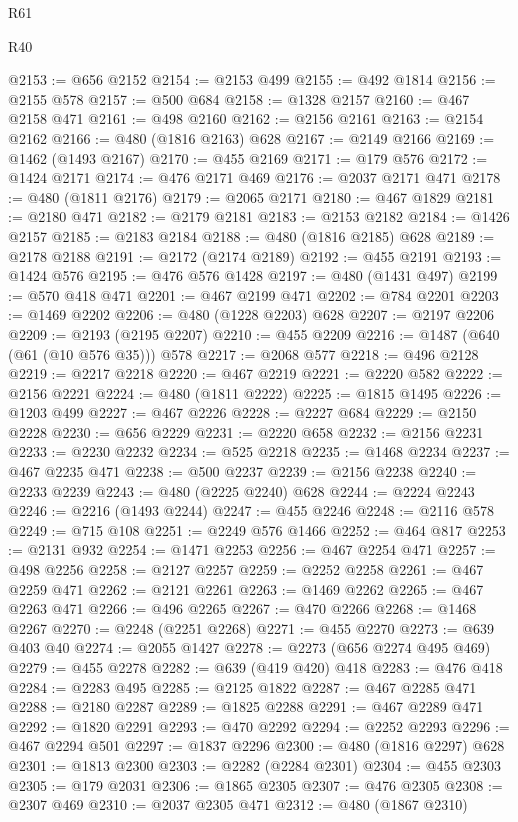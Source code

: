 \begin{lexlean}{R61}
\begin{lexlean}{R40}
\begin{coremodule}
{{{{{{{{{{{{{{{{{{{{{{{{{{{{{{{{{{{{{{{{{{{{{{{{{{{{{{{{{{{{{{{{{{{{{{{{{{{{{{{{{{{{{{{{{{{{{{{{{{{{{{{{{{{{{@2153 := @656 @2152
@2154 := @2153 @499
@2155 := @492 @1814
@2156 := @2155 @578
@2157 := @500 @684
@2158 := @1328 @2157
@2160 := @467 @2158 @471
@2161 := @498 @2160
@2162 := @2156 @2161
@2163 := @2154 @2162
@2166 := @480 (@1816 @2163) @628
@2167 := @2149 @2166
@2169 := @1462 (@1493 @2167)
@2170 := @455 @2169
@2171 := @179 @576
@2172 := @1424 @2171
@2174 := @476 @2171 @469
@2176 := @2037 @2171 @471
@2178 := @480 (@1811 @2176)
@2179 := @2065 @2171
@2180 := @467 @1829
@2181 := @2180 @471
@2182 := @2179 @2181
@2183 := @2153 @2182
@2184 := @1426 @2157
@2185 := @2183 @2184
@2188 := @480 (@1816 @2185) @628
@2189 := @2178 @2188
@2191 := @2172 (@2174 @2189)
@2192 := @455 @2191
@2193 := @1424 @576
@2195 := @476 @576 @1428
@2197 := @480 (@1431 @497)
@2199 := @570 @418 @471
@2201 := @467 @2199 @471
@2202 := @784 @2201
@2203 := @1469 @2202
@2206 := @480 (@1228 @2203) @628
@2207 := @2197 @2206
@2209 := @2193 (@2195 @2207)
@2210 := @455 @2209
@2216 := @1487 (@640 (@61 (@10 @576 @35))) @578
@2217 := @2068 @577
@2218 := @496 @2128
@2219 := @2217 @2218
@2220 := @467 @2219
@2221 := @2220 @582
@2222 := @2156 @2221
@2224 := @480 (@1811 @2222)
@2225 := @1815 @1495
@2226 := @1203 @499
@2227 := @467 @2226
@2228 := @2227 @684
@2229 := @2150 @2228
@2230 := @656 @2229
@2231 := @2220 @658
@2232 := @2156 @2231
@2233 := @2230 @2232
@2234 := @525 @2218
@2235 := @1468 @2234
@2237 := @467 @2235 @471
@2238 := @500 @2237
@2239 := @2156 @2238
@2240 := @2233 @2239
@2243 := @480 (@2225 @2240) @628
@2244 := @2224 @2243
@2246 := @2216 (@1493 @2244)
@2247 := @455 @2246
@2248 := @2116 @578
@2249 := @715 @108
@2251 := @2249 @576 @1466
@2252 := @464 @817
@2253 := @2131 @932
@2254 := @1471 @2253
@2256 := @467 @2254 @471
@2257 := @498 @2256
@2258 := @2127 @2257
@2259 := @2252 @2258
@2261 := @467 @2259 @471
@2262 := @2121 @2261
@2263 := @1469 @2262
@2265 := @467 @2263 @471
@2266 := @496 @2265
@2267 := @470 @2266
@2268 := @1468 @2267
@2270 := @2248 (@2251 @2268)
@2271 := @455 @2270
@2273 := @639 @403 @40
@2274 := @2055 @1427
@2278 := @2273 (@656 @2274 @495 @469)
@2279 := @455 @2278
@2282 := @639 (@419 @420) @418
@2283 := @476 @418
@2284 := @2283 @495
@2285 := @2125 @1822
@2287 := @467 @2285 @471
@2288 := @2180 @2287
@2289 := @1825 @2288
@2291 := @467 @2289 @471
@2292 := @1820 @2291
@2293 := @470 @2292
@2294 := @2252 @2293
@2296 := @467 @2294 @501
@2297 := @1837 @2296
@2300 := @480 (@1816 @2297) @628
@2301 := @1813 @2300
@2303 := @2282 (@2284 @2301)
@2304 := @455 @2303
@2305 := @179 @2031
@2306 := @1865 @2305
@2307 := @476 @2305
@2308 := @2307 @469
@2310 := @2037 @2305 @471
@2312 := @480 (@1867 @2310)
}}}}}}}}}}}}}}}}}}}}}}}}}}}}}}}}}}}}}}}}}}}}}}}}}}}}}}}}}}}}}}}}}}}}}}}}}}}}}}}}}}}}}}}}}}}}}}}}}}}}}}}}}}}}}
\end{coremodule}
\end{lexlean}
\end{lexlean}

